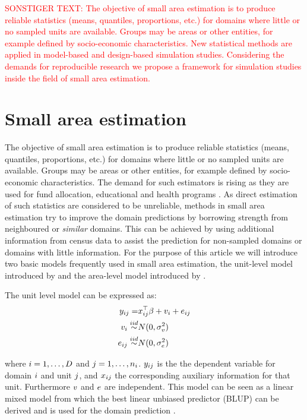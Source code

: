 \documentclass[article]{ajs}
\begin{document}
\textcolor{red}{SONSTIGER TEXT:
The objective of small area estimation is to produce reliable statistics (means, quantiles, proportions, etc.) for domains where little or no sampled units are available. Groups may be areas or other entities, for example defined by socio-economic characteristics. New statistical methods are applied in model-based and design-based simulation studies. Considering the demands for reproducible research we propose a framework for simulation studies inside the field of small area estimation.}


\section{Small area estimation}
\label{sec:SAE}
The objective of small area estimation is to produce reliable statistics (means, quantiles, proportions, etc.) for domains where little or no sampled units are available. Groups may be areas or other entities, for example defined by socio-economic characteristics. The demand for such estimators is rising as they are used for fund allocation, educational and health programs \citep{pfeffermann13}. As direct estimation of such statistics are considered to be unreliable, methods in small area estimation try to improve the domain predictions by borrowing strength from neighboured or \textit{similar} domains. This can be achieved by using additional information from census data to assist the prediction for non-sampled domains or domains with little information. For the purpose of this article we will introduce two basic models frequently used in small area estimation, the unit-level model introduced by \cite{battese88} and the area-level model introduced by \cite{fay79}.

The unit level model \citep{battese88} can be expressed as:
\begin{eqnarray}
	 y_{ij} =& x_{ij}^\top\beta + v_{i} + e_{ij} \nonumber \\
	v_{i} \stackrel{iid}{\sim}& N(0, \sigma_v^2)  \nonumber \\
	e_{ij} \stackrel{iid}{\sim}& N(0, \sigma_e^2) \nonumber
\end{eqnarray}

where $i = 1, \dots, D$ and $j = 1, \dots, n_i$. $y_{ij}$ is the the dependent variable for domain $i$ and unit $j$, and $x_{ij}$ the corresponding auxiliary information for that unit. Furthermore $v$ and $e$ are independent. This model can be seen as a linear mixed model from which the best linear unbiased predictor (BLUP) can be derived and is used for the domain prediction \citep{rao03}.
\end{document}
